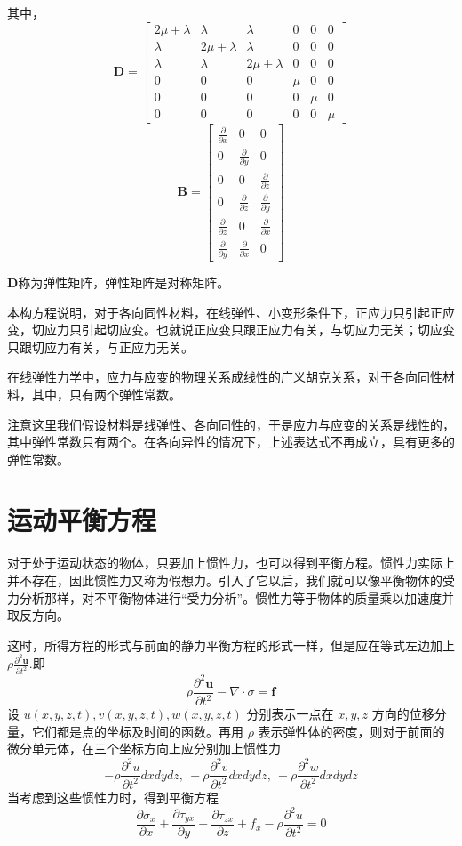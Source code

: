 \documentclass[12pt,a4paper]{article}
\begin{document}
其中，
$$
\textbf{D}=\begin{bmatrix}
2\mu+\lambda & \lambda & \lambda & 0 & 0 & 0 \\
\lambda & 2\mu+\lambda  & \lambda & 0 & 0 & 0 \\
\lambda &  \lambda & 2\mu+\lambda & 0 & 0 & 0 \\
0 & 0 & 0 & \mu & 0 & 0 \\
0 & 0 & 0 & 0 & \mu & 0 \\
0 & 0 & 0 & 0 & 0 & \mu
\end{bmatrix}
$$
$$
\textbf{B}=\begin{bmatrix}
\frac{\partial}{\partial x} & 0 & 0 \\
0 & \frac{\partial}{\partial y}  & 0 \\
0 &  0 &\frac{\partial}{\partial z} \\
0 & \frac{\partial}{\partial z} & \frac{\partial}{\partial y} \\
\frac{\partial}{\partial z} & 0 & \frac{\partial}{\partial x} \\
\frac{\partial}{\partial y} & \frac{\partial}{\partial x} & 0 
\end{bmatrix}
$$

$\textbf{D}$称为弹性矩阵，弹性矩阵是对称矩阵。

本构方程说明，对于各向同性材料，在线弹性、小变形条件下，正应力只引起正应变，切应力只引起切应变。也就说正应变只跟正应力有关，与切应力无关；切应变只跟切应力有关，与正应力无关。

在线弹性力学中，应力与应变的物理关系成线性的广义胡克关系，对于各向同性材料，其中，只有两个弹性常数。

注意这里我们假设材料是线弹性、各向同性的，于是应力与应变的关系是线性的，其中弹性常数只有两个。在各向异性的情况下，上述表达式不再成立，具有更多的弹性常数。

\section{运动平衡方程}
对于处于运动状态的物体，只要加上惯性力，也可以得到平衡方程。惯性力实际上并不存在，因此惯性力又称为假想力。引入了它以后，我们就可以像平衡物体的受力分析那样，对不平衡物体进行“受力分析”。惯性力等于物体的质量乘以加速度并取反方向。

这时，所得方程的形式与前面的静力平衡方程的形式一样，但是应在等式左边加上 $\rho\frac{\partial ^2\textbf{u}}{\partial t^2}$.即
$$
\rho\frac{\partial^2 \textbf{u}}{\partial t^2}-\nabla\cdot \sigma = \textbf{f}
$$
设 $u(x,y,z,t),v(x,y,z,t),w(x,y,z,t)$ 分别表示一点在 $x,y,z$ 方向的位移分量，它们都是点的坐标及时间的函数。再用 $\rho$ 表示弹性体的密度，则对于前面的微分单元体，在三个坐标方向上应分别加上惯性力 
$$-\rho\frac{\partial ^2 u}{\partial t^2}dxdydz,~ -\rho\frac{\partial ^2 v}{\partial t^2}dxdydz,~ -\rho\frac{\partial ^2 w}{\partial t^2}dxdydz
$$
当考虑到这些惯性力时，得到平衡方程
$$
\frac{\partial\sigma_x}{\partial x}+\frac{\partial\tau_{yx}}{\partial y}+\frac{\partial\tau_{zx}}{\partial z}+f_x-\rho\frac{\partial ^2 u}{\partial t^2}=0
$$
\end{document}
